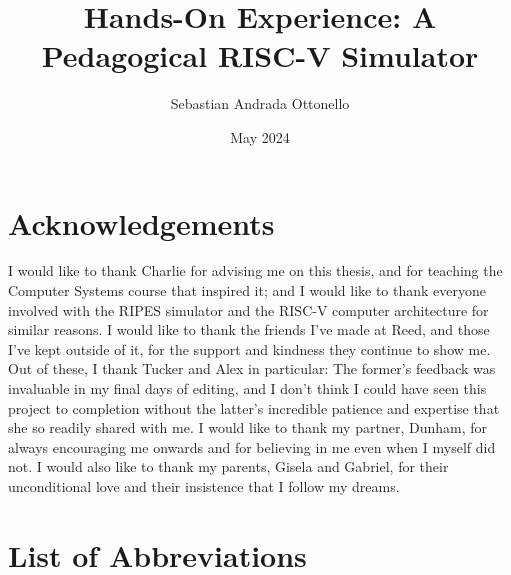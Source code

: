 \documentclass[12pt,twoside]{reedthesis}
\title{Hands-On Experience: A Pedagogical RISC-V Simulator}
\author{Sebastian Andrada Ottonello}
\date{May 2024}
\begin{document}
\maketitle
\frontmatter %
\pagestyle{empty} %

\chapter*{Acknowledgements}
I would like to thank Charlie for advising me on this thesis, and for teaching the Computer Systems course that inspired it; and I would like to thank everyone involved with the RIPES simulator and the RISC-V computer architecture for similar reasons.
I would like to thank the friends I've made at Reed, and those I've kept outside of it, for the support and kindness they continue to show me. Out of these, I thank Tucker and Alex in particular: The former's feedback was invaluable in my final days of editing, and I don't think I could have seen this project to completion without the latter's incredible patience and expertise that she so readily shared with me.
I would like to thank my partner, Dunham, for always encouraging me onwards and for believing in me even when I myself did not.
I would also like to thank my parents, Gisela and Gabriel, for their unconditional love and their insistence that I follow my dreams.




\chapter*{List of Abbreviations}
\end{document}
